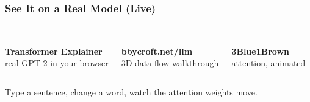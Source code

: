 \begin{frame}
    \frametitle{See It on a Real Model (Live)}

    \begin{columns}[c]
            \begin{center}
                \\[1mm]
                {\footnotesize \textbf{Transformer Explainer}\\ real GPT-2 in your browser}
            \end{center}
            \begin{center}
                \\[1mm]
                {\footnotesize \textbf{bbycroft.net/llm}\\ 3D data-flow walkthrough}
            \end{center}
            \begin{center}
                \\[1mm]
                {\footnotesize \textbf{3Blue1Brown}\\ attention, animated}
            \end{center}
    \end{columns}

    \vfill
    \begin{center}\footnotesize Type a sentence, change a word, watch the attention weights move.\end{center}
\end{frame}